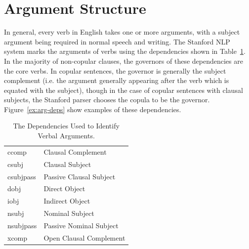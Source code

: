 \documentclass[main.tex]{subfiles}
\begin{document}
\section{Argument Structure}

In general, every verb in English takes one or more arguments, with a subject argument being required in normal speech and writing. The Stanford NLP system marks the arguments of verbs using the dependencies shown in Table~\ref{table:arg-deps}. In the majority of non-copular clauses, the governors of these dependencies are the core verbs. In copular sentences, the governor is generally the subject complement (i.e. the argument generally appearing after the verb which is equated with the subject), though in the case of copular sentences with clausal subjects, the Stanford parser chooses the copula to be the governor.
Figure~\ref{ex:arg-deps} show examples of these dependencies.

\begin{table}[ht]
\small
\centering
\caption{The Dependencies Used to Identify Verbal Arguments.}
\begin{tabular}{ l l }
\toprule
ccomp & Clausal Complement\\
csubj & Clausal Subject\\
csubjpass & Passive Clausal Subject\\
dobj & Direct Object\\
iobj & Indirect Object \\
nsubj & Nominal Subject\\
nsubjpass & Passive Nominal Subject\\
xcomp & Open Clausal Complement\\

\bottomrule
\end{tabular}
\label{table:arg-deps}
\end{table}
\end{document}
